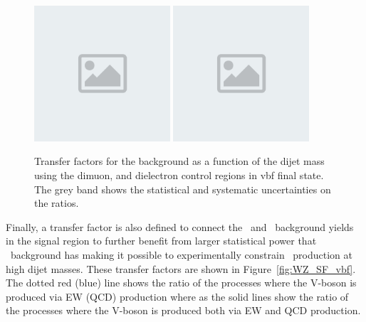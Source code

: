 \begin{figure}[htbp]
  \centering
        \includegraphics[width=0.45\textwidth]{placeholder.png}
        \includegraphics[width=0.45\textwidth]{placeholder.png}
\\
  \caption{Transfer factors for the \Zvvjets background as a function of the dijet mass using the dimuon, and dielectron control regions in vbf final state. The grey band shows the statistical and systematic uncertainties on the ratios. }
    \label{fig:ZvvZmmSF}
\end{figure}


Finally, a transfer factor is also defined to connect the \Zvvjets~and \Wlvjets~background yields 
in the signal region to further benefit from larger statistical power that \Wlvjets~background has
making it possible to experimentally constrain \Zvvjets~production at high dijet masses.
These transfer factors are shown in Figure~\ref{fig:WZ_SF_vbf}. The dotted red (blue) line shows the ratio of the processes where the V-boson
is produced via EW (QCD) production where as the solid lines show the ratio of the processes where the V-boson is produced both
via EW and QCD production.

